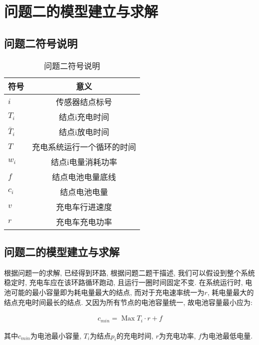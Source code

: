 
\newpage
\section{问题二的模型建立与求解}
\label{sec:method2}
\subsection{问题二符号说明}

\begin{table}[h]
	\begin{center}
		\caption{问题二符号说明}
		\begin{tabular}{l|c}
			\toprule[2pt] 
			    符号 & 意义 \\ \hline
			 $i$& 传感器结点标号\\
             $T_i$&结点i充电时间\\
             $\bar{T}_i$&结点i放电时间\\
             $T$&充电系统运行一个循环的时间\\
			 $w_i$&结点i电量消耗功率\\
			 $f$&结点电池电量底线\\
			 $c_i$&结点电池电量\\
			 $v$&充电车行进速度\\
			 $r$&充电车充电功率\\
			
			\toprule[2pt] 
		\end{tabular}
		
		\label{tab:distribution}
		\vspace{-0.4cm}
	\end{center}
\end{table}


\subsection{问题二的模型建立与求解}
根据问题一的求解, 已经得到环路, 根据问题二题干描述, 我们可以假设到整个系统稳定时, 充电车应在该环路循环跑动, 且运行一圈时间固定不变. 在系统运行时, 电池可能的最小容量即为耗电量最大的结点, 而对于充电速率统一为$r$, 耗电量最大的结点充电时间最长的结点. 又因为所有节点的电池容量统一, 故电池容量最小应为:

\begin{eqnarray}
    c_{min} = \mathop{Max} T_i \cdot r + f
    \label{eq:cmin}
\end{eqnarray}

其中$c_{min}$为电池最小容量, $T_i$为结点$p_i$的充电时间, $r$为充电功率, $f$为电池最低电量.

